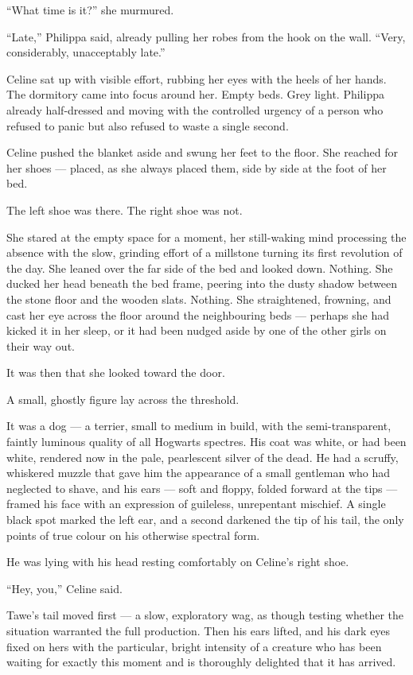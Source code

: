 \enquote{What time is it?} she murmured.

\enquote{Late,} Philippa said, already pulling her robes from the hook on the wall. \enquote{Very, considerably, unacceptably late.}

Celine sat up with visible effort, rubbing her eyes with the heels of her hands. The dormitory came into focus around her. Empty beds. Grey light. Philippa already half-dressed and moving with the controlled urgency of a person who refused to panic but also refused to waste a single second.

Celine pushed the blanket aside and swung her feet to the floor. She reached for her shoes --- placed, as she always placed them, side by side at the foot of her bed.

The left shoe was there. The right shoe was not.

She stared at the empty space for a moment, her still-waking mind processing the absence with the slow, grinding effort of a millstone turning its first revolution of the day. She leaned over the far side of the bed and looked down. Nothing. She ducked her head beneath the bed frame, peering into the dusty shadow between the stone floor and the wooden slats. Nothing. She straightened, frowning, and cast her eye across the floor around the neighbouring beds --- perhaps she had kicked it in her sleep, or it had been nudged aside by one of the other girls on their way out.

It was then that she looked toward the door.

A small, ghostly figure lay across the threshold.

It was a dog --- a terrier, small to medium in build, with the semi-transparent, faintly luminous quality of all Hogwarts spectres. His coat was white, or had been white, rendered now in the pale, pearlescent silver of the dead. He had a scruffy, whiskered muzzle that gave him the appearance of a small gentleman who had neglected to shave, and his ears --- soft and floppy, folded forward at the tips --- framed his face with an expression of guileless, unrepentant mischief. A single black spot marked the left ear, and a second darkened the tip of his tail, the only points of true colour on his otherwise spectral form.

He was lying with his head resting comfortably on Celine's right shoe.

\enquote{Hey, you,} Celine said.

Tawe's tail moved first --- a slow, exploratory wag, as though testing whether the situation warranted the full production. Then his ears lifted, and his dark eyes fixed on hers with the particular, bright intensity of a creature who has been waiting for exactly this moment and is thoroughly delighted that it has arrived.

